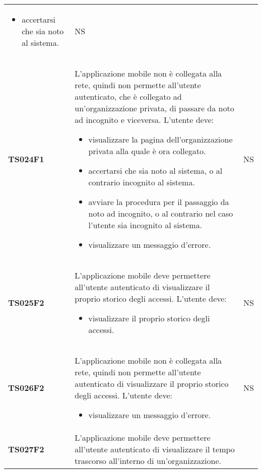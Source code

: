 \documentclass[../piano-di-qualifica.tex]{subfiles}
\begin{document}
\begin{centering}
\begin{longtable}[H]{>{\centering\bfseries}m{3cm} >{}p{10cm} >{\centering\arraybackslash}m{3cm}}
\begin{itemize}
                          \item accertarsi che sia noto al sistema.
                        \end{itemize}
                    & NS \\
        TS024F1     & L'applicazione mobile non è collegata alla rete, quindi non permette all'utente autenticato, che è collegato ad un'organizzazione privata, di passare da noto ad incognito e viceversa. \newline
                      L'utente deve:
                        \begin{itemize}
                          \item visualizzare la pagina dell'organizzazione privata alla quale è ora collegato.
                          \item accertarsi che sia noto al sistema, o al contrario incognito al sistema.
                          \item avviare la procedura per il passaggio da noto ad incognito, o al contrario nel caso l'utente sia incognito al sistema.
                          \item visualizzare un messaggio d'errore.
                        \end{itemize}
                    & NS \\
        TS025F2     & L'applicazione mobile deve permettere all'utente autenticato di visualizzare il proprio storico degli accessi. \newline
                      L'utente deve:
                        \begin{itemize}
                          \item visualizzare il proprio storico degli accessi.
                        \end{itemize}
                    & NS \\
        TS026F2     & L'applicazione mobile non è collegata alla rete, quindi non permette all'utente autenticato di visualizzare il proprio storico degli accessi. \newline
                      L'utente deve:
                        \begin{itemize}
                          \item visualizzare un messaggio d'errore.
                        \end{itemize}
                    & NS \\
        TS027F2     & L'applicazione mobile deve permettere all'utente autenticato di visualizzare il tempo trascorso all'interno di un'organizzazione. \newline

\end{longtable}
\end{centering}
\end{document}
